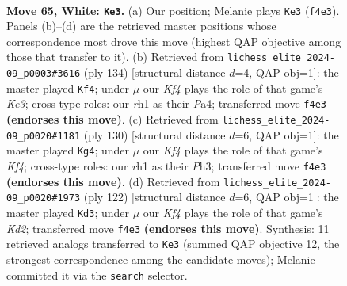\documentclass[11pt]{article}
\begin{document}
\clearpage

\begin{figure}[p]\centering
\begin{subfigure}{0.46\textwidth}\centering
\resizebox{\linewidth}{!}{%
\newchessgame
\chessboard[
  setfen={8/6k1/2p5/p2p4/5K2/8/8/7r w - - 0 65},
  showmover=false,
  pgfstyle=straightmove, color=movearrow, markmove={f4-e3}
]}
\caption{}
\end{subfigure}\hfill
\begin{subfigure}{0.46\textwidth}\centering
\resizebox{\linewidth}{!}{%
\newchessgame
\chessboard[
  setfen={8/8/3k2p1/5p2/P7/4K3/8/8 w - - 3 68},
  showmover=false,
  pgfstyle=straightmove, color=movearrow, markmove={e3-f4}
]}
\caption{}
\end{subfigure}
\\[4pt]
\begin{subfigure}{0.46\textwidth}\centering
\resizebox{\linewidth}{!}{%
\newchessgame
\chessboard[
  setfen={8/5p2/3k2p1/8/5K1p/7P/8/8 w - - 3 66},
  showmover=false,
  pgfstyle=straightmove, color=movearrow, markmove={f4-g4}
]}
\caption{}
\end{subfigure}\hfill
\begin{subfigure}{0.46\textwidth}\centering
\resizebox{\linewidth}{!}{%
\newchessgame
\chessboard[
  setfen={8/8/4p3/3p4/5k2/8/3K4/8 w - - 2 62},
  showmover=false,
  pgfstyle=straightmove, color=movearrow, markmove={d2-d3}
]}
\caption{}
\end{subfigure}
\caption{\textbf{Move 65, White: \texttt{Ke3}.} (a) Our position; Melanie plays \texttt{Ke3} (\texttt{f4e3}). Panels (b)--(d) are the retrieved master positions whose correspondence most drove this move (highest QAP objective among those that transfer to it). (b) Retrieved from \texttt{lichess\_elite\_2024-09\_p0003\#3616} (ply 134) [structural distance $d$=4, QAP obj=1]: the master played \texttt{Kf4}; under $\mu$ our \emph{Kf4} plays the role of that game's \emph{Ke3}; cross-type roles: our \emph{r}h1 as their \emph{P}a4; transferred move \texttt{f4e3} \textbf{(endorses this move)}. (c) Retrieved from \texttt{lichess\_elite\_2024-09\_p0020\#1181} (ply 130) [structural distance $d$=6, QAP obj=1]: the master played \texttt{Kg4}; under $\mu$ our \emph{Kf4} plays the role of that game's \emph{Kf4}; cross-type roles: our \emph{r}h1 as their \emph{P}h3; transferred move \texttt{f4e3} \textbf{(endorses this move)}. (d) Retrieved from \texttt{lichess\_elite\_2024-09\_p0020\#1973} (ply 122) [structural distance $d$=6, QAP obj=1]: the master played \texttt{Kd3}; under $\mu$ our \emph{Kf4} plays the role of that game's \emph{Kd2}; transferred move \texttt{f4e3} \textbf{(endorses this move)}. Synthesis: 11 retrieved analogs transferred to \texttt{Ke3} (summed QAP objective 12, the strongest correspondence among the candidate moves); Melanie committed it via the \texttt{search} selector.}
\label{fig:thought-m128}
\end{figure}
\end{document}

